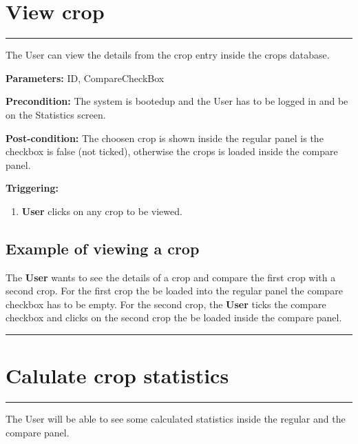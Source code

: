 


\section{View crop}
\hrule
\hfill
\vspace{0.5cm}
\label{operation:View crop}

The User can view the details from the crop entry inside the crops database.

\begin{description}

\item \textbf{Parameters:} ID, CompareCheckBox
\item \textbf{Precondition:} The system is bootedup and the User has to be
logged in and be on the Statistics screen.
\item \textbf{Post-condition:} The choosen crop is shown inside the regular panel is the checkbox is false (not ticked), otherwise the crops is loaded inside the compare panel.
\item \textbf{Triggering:}
\begin{enumerate}

\item \textbf{User} clicks on any crop to be viewed.

\end{enumerate}
\end{description}

\subsection{Example of viewing a crop}
The \textbf{User} wants to see the details of a crop and compare the first crop with a second crop. For the first crop the be loaded into the regular panel the compare checkbox has to be empty. 
For the second crop, the \textbf{User} ticks the compare checkbox and clicks on the second crop the be loaded inside the compare panel.
\hfill
\vspace{0.5cm}
\hrule



\section{Calulate crop statistics}
\hrule
\hfill
\vspace{0.5cm}
\label{operation:Calculate crop statistics}

The User will be able to see some calculated statistics inside the regular and the compare panel.

